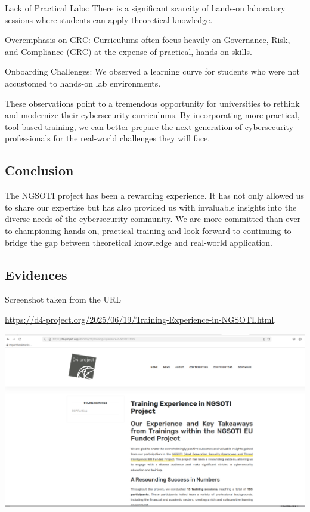 \documentclass[10pt,a4paper]{report}
\begin{document}
\begin{description}
    \item {Lack of Practical Labs}: There is a significant scarcity of
hands-on laboratory sessions where students can apply theoretical knowledge.
    \item {Overemphasis on GRC}: Curriculums often focus heavily on Governance,
Risk, and Compliance (GRC) at the expense of practical, hands-on skills.
    \item {Onboarding Challenges}: We observed a learning curve for students
who were not accustomed to hands-on lab environments.
\end{description}

These observations point to a tremendous opportunity for universities to
rethink and modernize their cybersecurity curriculums. By incorporating more
practical, tool-based training, we can better prepare the next generation of
cybersecurity professionals for the real-world challenges they will face.

\subsection*{Conclusion}
The NGSOTI project has been a rewarding experience. It has not only allowed
us to share our expertise but has also provided us with invaluable insights
into the diverse needs of the cybersecurity community. We are more committed
than ever to championing hands-on, practical training and look forward to
continuing to bridge the gap between theoretical knowledge and real-world
application.

\subsection*{Evidences}
Screenshot taken from the URL

\url{https://d4-project.org/2025/06/19/Training-Experience-in-NGSOTI.html}.

\includegraphics[scale=0.3]{screenshot.png}
\end{document}
